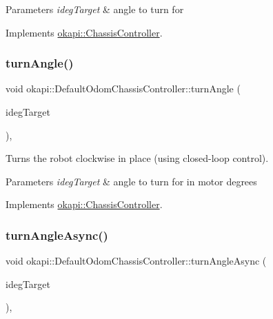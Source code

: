 \begin{DoxyParams}{Parameters}
{\em ideg\+Target} & angle to turn for \\
\hline
\end{DoxyParams}


Implements \mbox{\hyperlink{classokapi_1_1ChassisController_aab12308b3fad6793c007d7a33730a3f7}{okapi\+::\+Chassis\+Controller}}.

\mbox{\label{classokapi_1_1DefaultOdomChassisController_a05a8a6684b3afe4f7c2ecbc24699f70d}} 
\subsubsection{\texorpdfstring{turnAngle()}{turnAngle()}\hspace{0.1cm}{\footnotesize\ttfamily [2/2]}}
{\footnotesize\ttfamily void okapi\+::\+Default\+Odom\+Chassis\+Controller\+::turn\+Angle (\begin{DoxyParamCaption}\item[{double}]{ideg\+Target }\end{DoxyParamCaption})\hspace{0.3cm}{\ttfamily [override]}, {\ttfamily [virtual]}}

Turns the robot clockwise in place (using closed-\/loop control).


\begin{DoxyParams}{Parameters}
{\em ideg\+Target} & angle to turn for in motor degrees \\
\hline
\end{DoxyParams}


Implements \mbox{\hyperlink{classokapi_1_1ChassisController_a6aca227e35ececd02eed1cc42d09ad1d}{okapi\+::\+Chassis\+Controller}}.

\mbox{\label{classokapi_1_1DefaultOdomChassisController_a18d748097a7938e3102638d17be54c76}} 
\subsubsection{\texorpdfstring{turnAngleAsync()}{turnAngleAsync()}\hspace{0.1cm}{\footnotesize\ttfamily [1/2]}}
{\footnotesize\ttfamily void okapi\+::\+Default\+Odom\+Chassis\+Controller\+::turn\+Angle\+Async (\begin{DoxyParamCaption}\item[{Q\+Angle}]{ideg\+Target }\end{DoxyParamCaption})\hspace{0.3cm}{\ttfamily [override]}, {\ttfamily [virtual]}}

